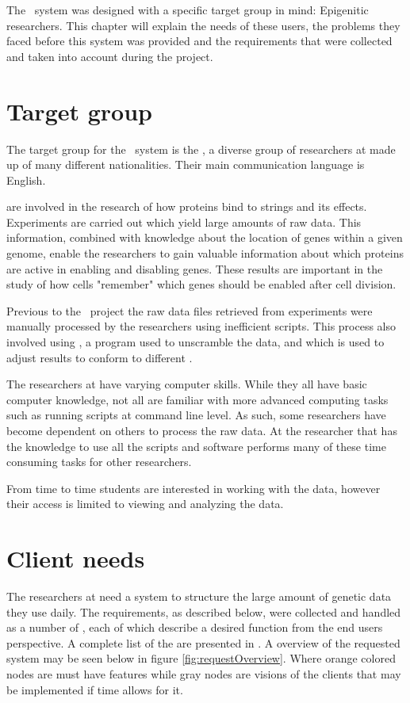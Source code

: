 The \appName\ system was designed with a specific target group in mind: Epigenitic researchers. This chapter will explain the needs of these users, the problems they faced before this system was provided and the requirements that were collected and taken into account during the project.

\section{Target group}

The target group for the \appName\ system is  the , a diverse group of researchers at  made up of many different nationalities. Their main communication language is English.

 are involved in the research of how proteins bind to  strings and its effects. Experiments are carried out which yield large amounts of raw data. This information, combined with knowledge about the location of genes within a given genome, enable the researchers to gain valuable information about which proteins are active in enabling and disabling genes. These results are important in the study of how cells "remember" which genes should be enabled after cell division.

Previous to the \appName\ project the raw data files retrieved from experiments were manually processed by the researchers using inefficient  scripts. This process also involved using \cite{BOWTIE}, a program used to unscramble the  data, and \cite{LIFTOVER} which is used to adjust results to conform to different .

The researchers at  have varying computer skills. While they all have basic computer knowledge, not all are familiar with more advanced computing tasks such as running scripts at command line level. As such, some researchers have become dependent on others to process the raw data. At  the researcher that has the knowledge to use all the scripts and software performs many of these time consuming tasks for other researchers.

From time to time students are interested in working with the data, however their access is limited to viewing and analyzing the data. 


\section{Client needs}
The researchers at  need a system to structure the large amount of genetic data they use daily. The requirements, as described below, were collected and handled as a number of , each of which describe a desired function from the end users perspective. A complete list of the  are presented in . %
A overview of the requested system may be seen below in figure \ref{fig:requestOverview}. Where orange colored nodes are must have features while gray nodes are visions of the clients that may be implemented if time allows for it.

